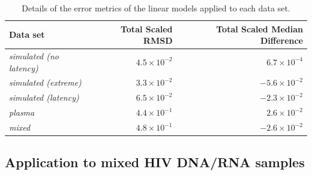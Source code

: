 \documentclass[12pt]{article}
\begin{document}
\begin{table}
\def\arraystretch{1.3}%
\begin{center}
\begin{tabular}{lrr}
Data set & Total Scaled RMSD & Total Scaled Median Difference \\ %
\hline
\emph{simulated (no latency)} & $4.5 \times 10^{-2}$ & $6.7 \times 10^{-4}$ \\%
\emph{simulated (extreme)} & $3.3 \times 10^{-2}$ & $-5.6 \times 10^{-2}$ \\ %
\emph{simulated (latency)} & $6.5 \times 10^{-2}$ & $-2.3 \times 10^{-2}$ \\ %
\emph{plasma} & $4.4 \times 10^{-1}$ & $2.6 \times 10^{-2}$ \\ %
\emph{mixed} & $4.8 \times 10^{-1}$ & $-2.6 \times 10^{-2}$ \\ %
\hline
\end{tabular}
\end{center}
 \caption{
 {Details of the error metrics of the linear models applied to each data set.}
 }\label{tab:error} 
\end{table}

\subsection * {Application to mixed HIV DNA/RNA samples} \label{sec:mixed_data}


\end{document}
